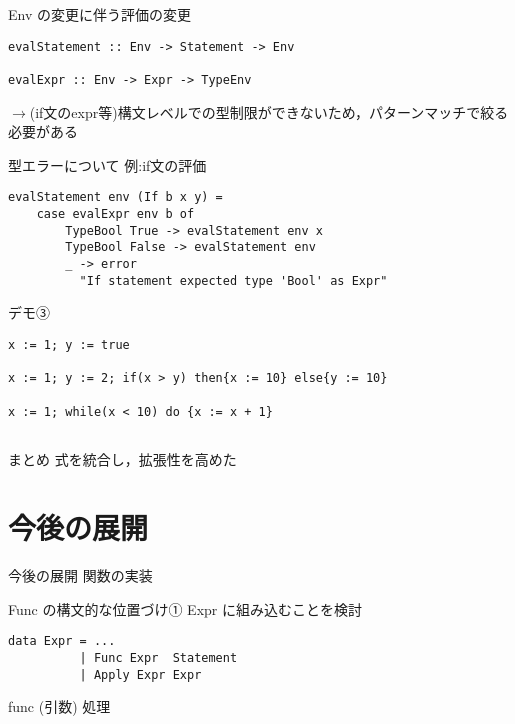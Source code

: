 \documentclass[uplatex,dvipdfmx,ja=standard]{beamer}
\begin{document}
\begin{frame}[fragile]{Env の変更に伴う評価の変更}
    
    \begin{verbatim}
evalStatement :: Env -> Statement -> Env 

evalExpr :: Env -> Expr -> TypeEnv
    \end{verbatim}

    $\to$(if文のexpr等)構文レベルでの型制限ができないため，パターンマッチで絞る必要がある
\end{frame}

\begin{frame}[fragile]{型エラーについて}
    例:if文の評価

    \begin{verbatim}
evalStatement env (If b x y) = 
    case evalExpr env b of 
        TypeBool True -> evalStatement env x
        TypeBool False -> evalStatement env
        _ -> error 
          "If statement expected type 'Bool' as Expr" 
    \end{verbatim}

\end{frame}

\begin{frame}[fragile]{デモ③}
    \begin{verbatim}
x := 1; y := true

x := 1; y := 2; if(x > y) then{x := 10} else{y := 10}

x := 1; while(x < 10) do {x := x + 1}
    \end{verbatim}
\end{frame}

\subsection{}

\begin{frame}{まとめ}
    式を統合し，拡張性を高めた
\end{frame}


\section{今後の展開}
\begin{frame}{今後の展開}
    関数の実装
\end{frame}

\begin{frame}[fragile]{Func の構文的な位置づけ①}
    Expr に組み込むことを検討
    \begin{verbatim}
data Expr = ...
          | Func Expr  Statement
          | Apply Expr Expr
    \end{verbatim}
    func (引数) 処理
\end{frame}
\end{document}
